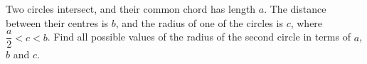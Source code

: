 Two circles intersect, and their common chord has length $a$. The distance between their centres is $b$, and the radius of one of the circles is $c$, where $\dfrac {a}{2}<c<b$. Find all possible values of the radius of the second circle in terms of $a$, $b$ and $c$.
